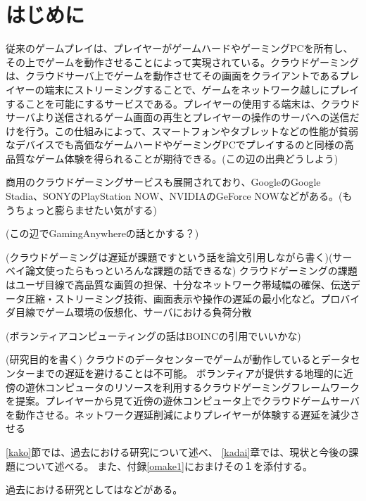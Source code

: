 \section{はじめに}

 従来のゲームプレイは、プレイヤーがゲームハードやゲーミングPCを所有し、その上でゲームを動作させることによって実現されている。クラウドゲーミングは、クラウドサーバ上でゲームを動作させてその画面をクライアントであるプレイヤーの端末にストリーミングすることで、ゲームをネットワーク越しにプレイすることを可能にするサービスである。プレイヤーの使用する端末は、クラウドサーバより送信されるゲーム画面の再生とプレイヤーの操作のサーバへの送信だけを行う。この仕組みによって、スマートフォンやタブレットなどの性能が貧弱なデバイスでも高価なゲームハードやゲーミングPCでプレイするのと同様の高品質なゲーム体験を得られることが期待できる。(この辺の出典どうしよう)

 商用のクラウドゲーミングサービスも展開されており、GoogleのGoogle Stadia、SONYのPlayStation NOW、NVIDIAのGeForce NOWなどがある。(もうちょっと膨らませたい気がする)

(この辺でGamingAnywhereの話とかする？)

(クラウドゲーミングは遅延が課題ですという話を論文引用しながら書く)(サーベイ論文使ったらもっといろんな課題の話できるな)
クラウドゲーミングの課題はユーザ目線で高品質な画質の担保、十分なネットワーク帯域幅の確保、伝送データ圧縮・ストリーミング技術、画面表示や操作の遅延の最小化など。プロバイダ目線でゲーム環境の仮想化、サーバにおける負荷分散

(ボランティアコンピューティングの話はBOINCの引用でいいかな)

(研究目的を書く)
クラウドのデータセンターでゲームが動作しているとデータセンターまでの遅延を避けることは不可能。
ボランティアが提供する地理的に近傍の遊休コンピュータのリソースを利用するクラウドゲーミングフレームワークを提案。プレイヤーから見て近傍の遊休コンピュータ上でクラウドゲームサーバを動作させる。ネットワーク遅延削減によりプレイヤーが体験する遅延を減少させる

\ref{kako}節では、過去における研究について述べ、
\ref{kadai}章では、現状と今後の課題について述べる。
また、付録\ref{omake1}におまけその１を添付する。

過去における研究としては\cite{alex_nips12}などがある。




 

